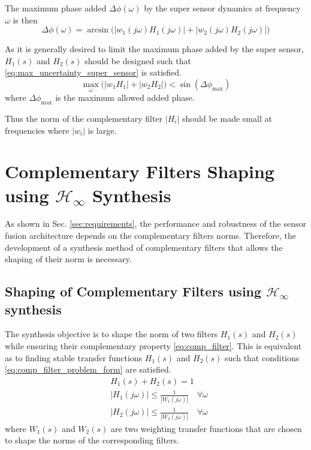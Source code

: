 \documentclass[conference]{IEEEtran}
\begin{document}
The maximum phase added \(\Delta\phi(\omega)\) by the super sensor dynamics at frequency \(\omega\) is then
\begin{equation}
\label{eq:max_phase_uncertainty}
    \Delta\phi(\omega) = \arcsin\big( |w_1(j\omega) H_1(j\omega)| + |w_2(j\omega) H_2(j\omega)| \big)
\end{equation}

As it is generally desired to limit the maximum phase added by the super sensor, \(H_1(s)\) and \(H_2(s)\) should be designed such that \eqref{eq:max_uncertainty_super_sensor} is satisfied.
\begin{equation}
\label{eq:max_uncertainty_super_sensor}
   \max_\omega \big( \left|w_1 H_1\right| + \left|w_2 H_2\right|\big) < \sin\left( \Delta \phi_\text{max} \right)
\end{equation}
where \(\Delta \phi_\text{max}\) is the maximum allowed added phase.

Thus the norm of the complementary filter \(|H_i|\) should be made small at frequencies where \(|w_i|\) is large.

\section{Complementary Filters Shaping using \(\mathcal{H}_\infty\) Synthesis}
\label{sec:orgcafbd82}
\label{sec:hinf_method}
As shown in Sec. \ref{sec:requirements}, the performance and robustness of the sensor fusion architecture depends on the complementary filters norms.
Therefore, the development of a synthesis method of complementary filters that allows the shaping of their norm is necessary.
\subsection{Shaping of Complementary Filters using \(\mathcal{H}_\infty\) synthesis}
\label{sec:orga863dd2}
\label{sec:hinf_synthesis}
The synthesis objective is to shape the norm of two filters \(H_1(s)\) and \(H_2(s)\) while ensuring their complementary property \eqref{eq:comp_filter}.
This is equivalent as to finding stable transfer functions \(H_1(s)\) and \(H_2(s)\) such that conditions \eqref{eq:comp_filter_problem_form} are satisfied.
\begin{subequations}
\label{eq:comp_filter_problem_form}
  \begin{align}
  & H_1(s) + H_2(s) = 1 \label{eq:hinf_cond_complementarity} \\
  & |H_1(j\omega)| \le \frac{1}{|W_1(j\omega)|} \quad \forall\omega \label{eq:hinf_cond_h1} \\
  & |H_2(j\omega)| \le \frac{1}{|W_2(j\omega)|} \quad \forall\omega \label{eq:hinf_cond_h2}
  \end{align}
\end{subequations}
where \(W_1(s)\) and \(W_2(s)\) are two weighting transfer functions that are chosen to shape the norms of the corresponding filters.
\end{document}
